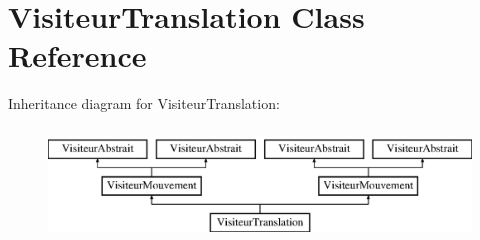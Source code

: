 \hypertarget{class_visiteur_translation}{\section{Visiteur\-Translation Class Reference}
\label{class_visiteur_translation}
}
Inheritance diagram for Visiteur\-Translation\-:\begin{figure}[H]
\begin{center}
\leavevmode
\includegraphics[height=3.000000cm]{class_visiteur_translation}
\end{center}
\end{figure}
